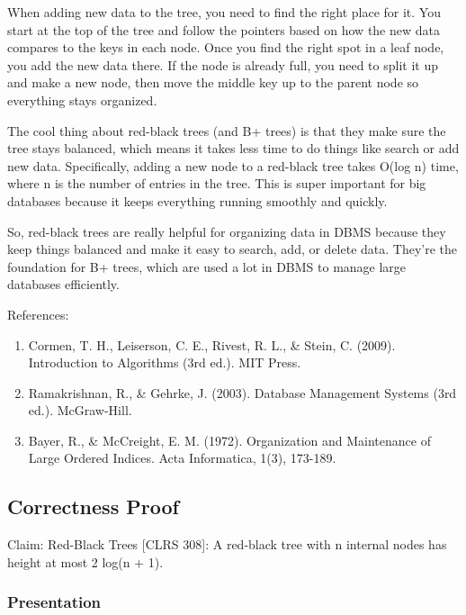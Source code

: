 \documentclass[10pt]{article}
\begin{document}
  \spacing
  \noindent
  When adding new data to the tree, you need to find the right place for it. You
  start at the top of the tree and follow the pointers based on how the new data
  compares to the keys in each node. Once you find the right spot in a leaf node,
  you add the new data there. If the node is already full, you need to split it up
  and make a new node, then move the middle key up to the parent node so
  everything stays organized.

  \spacing
  \noindent
  The cool thing about red-black trees (and B+ trees) is that they make sure the
  tree stays balanced, which means it takes less time to do things like search
  or add new data. Specifically, adding a new node to a red-black tree takes O(log
  n) time, where n is the number of entries in the tree. This is super important
  for big databases because it keeps everything running smoothly and quickly.

  \spacing
  \noindent
  So, red-black trees are really helpful for organizing data in DBMS because
  they keep things balanced and make it easy to search, add, or delete data. They're
  the foundation for B+ trees, which are used a lot in DBMS to manage large databases
  efficiently.

  \spacing
  \noindent
  References:

  \begin{enumerate}
    \item Cormen, T. H., Leiserson, C. E., Rivest, R. L., & Stein, C. (2009).
      Introduction to Algorithms (3rd ed.). MIT Press.

    \item Ramakrishnan, R., & Gehrke, J. (2003). Database Management Systems (3rd
      ed.). McGraw-Hill.

    \item Bayer, R., & McCreight, E. M. (1972). Organization and Maintenance of
      Large Ordered Indices. Acta Informatica, 1(3), 173-189.
  \end{enumerate}

  \subsection*{Correctness Proof}


  Claim: Red-Black Trees [CLRS 308]: A red-black tree with n internal nodes has
  height at most 2 log(n + 1).

  \subsubsection*{Presentation}
\end{document}
